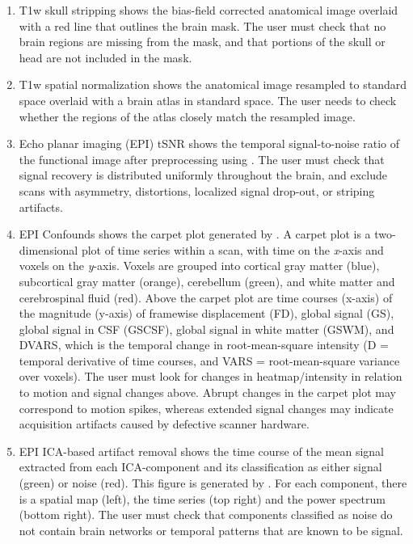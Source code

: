 \begin{enumerate}[leftmargin=*]

\item

T1w skull stripping shows the bias-field corrected anatomical image
overlaid with a red line that outlines the brain mask. The user must check
that no brain regions are missing from the mask, and that portions of the
skull or head are not included in the mask.

\item

T1w spatial normalization shows the anatomical image resampled to standard
space overlaid with a brain atlas in standard space. The user needs to
check whether the regions of the atlas closely match the resampled image.

\item

Echo planar imaging (EPI) tSNR shows the temporal signal-to-noise ratio of
the functional image after preprocessing using . The user
must check that signal recovery is distributed uniformly throughout the
brain, and exclude scans with asymmetry, distortions, localized signal
drop-out, or striping artifacts.

\item

EPI Confounds shows the carpet plot
\citep{10.1016/j.neuroimage.2016.08.009,10.1016/j.neuroimage.2020.116614}
generated by . A carpet plot is a two-dimensional plot of
time series within a scan, with time on the \emph{x}-axis and voxels on the
\emph{y}-axis. Voxels are grouped into cortical gray matter (blue),
subcortical gray matter (orange), cerebellum (green), and white matter and
cerebrospinal fluid (red). Above the carpet plot are time courses (x-axis)
of the magnitude (y-axis) of framewise displacement (FD), global signal
(GS), global signal in CSF (GSCSF), global signal in white matter (GSWM),
and DVARS, which is the temporal change in root-mean-square intensity (D =
temporal derivative of time courses, and VARS = root-mean-square variance
over voxels). The user must look for changes in heatmap/intensity in
relation to motion and signal changes above. Abrupt changes in the carpet
plot may correspond to motion spikes, whereas extended signal changes may
indicate acquisition artifacts caused by defective scanner hardware.

\item

EPI ICA-based artifact removal shows the time course of the mean signal
extracted from each ICA-component and its classification as either signal
(green) or noise (red). This figure is generated by . For
each component, there is a spatial map (left), the time series (top right)
and the power spectrum (bottom right). The user must check that components
classified as noise do not contain brain networks or temporal patterns that
are known to be signal.


\end{enumerate}
